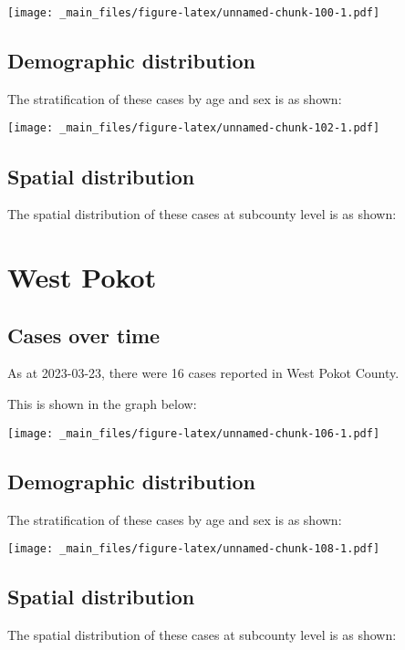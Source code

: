 \documentclass[
]{book}
\begin{document}
\texttt{[image: \_main\_files/figure-latex/unnamed-chunk-100-1.pdf]}

\hypertarget{demographic-distribution-16}{%
\section{Demographic distribution}\label{demographic-distribution-16}}

The stratification of these cases by age and sex is as shown:

\texttt{[image: \_main\_files/figure-latex/unnamed-chunk-102-1.pdf]}

\hypertarget{spatial-distribution-16}{%
\section{Spatial distribution}\label{spatial-distribution-16}}

The spatial distribution of these cases at subcounty level is as shown:

\hypertarget{west-pokot}{%
\chapter{West Pokot}\label{west-pokot}}

\hypertarget{cases-over-time-17}{%
\section{Cases over time}\label{cases-over-time-17}}

As at 2023-03-23, there were 16 cases reported in West Pokot County.

This is shown in the graph below:

\texttt{[image: \_main\_files/figure-latex/unnamed-chunk-106-1.pdf]}

\hypertarget{demographic-distribution-17}{%
\section{Demographic distribution}\label{demographic-distribution-17}}

The stratification of these cases by age and sex is as shown:

\texttt{[image: \_main\_files/figure-latex/unnamed-chunk-108-1.pdf]}

\hypertarget{spatial-distribution-17}{%
\section{Spatial distribution}\label{spatial-distribution-17}}

The spatial distribution of these cases at subcounty level is as shown:

  
\end{document}
